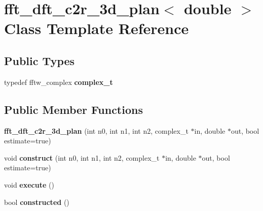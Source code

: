 \hypertarget{classfft__dft__c2r__3d__plan_3_01double_01_4}{
\section{fft\_\-dft\_\-c2r\_\-3d\_\-plan$<$ double $>$ Class Template Reference}
\label{classfft__dft__c2r__3d__plan_3_01double_01_4}
}
\subsection*{Public Types}
\begin{DoxyCompactItemize}
\item 
\hypertarget{classfft__dft__c2r__3d__plan_3_01double_01_4_af2e1937067ca9111b75f50a02b286be6}{
typedef fftw\_\-complex {\bfseries complex\_\-t}}
\label{classfft__dft__c2r__3d__plan_3_01double_01_4_af2e1937067ca9111b75f50a02b286be6}

\end{DoxyCompactItemize}
\subsection*{Public Member Functions}
\begin{DoxyCompactItemize}
\item 
\hypertarget{classfft__dft__c2r__3d__plan_3_01double_01_4_a6b75061e8b9a7e9610286a88d39c6de2}{
{\bfseries fft\_\-dft\_\-c2r\_\-3d\_\-plan} (int n0, int n1, int n2, complex\_\-t $\ast$in, double $\ast$out, bool estimate=true)}
\label{classfft__dft__c2r__3d__plan_3_01double_01_4_a6b75061e8b9a7e9610286a88d39c6de2}

\item 
\hypertarget{classfft__dft__c2r__3d__plan_3_01double_01_4_ac8a8cf81fd7a1744c7a6cea9c6a01a4c}{
void {\bfseries construct} (int n0, int n1, int n2, complex\_\-t $\ast$in, double $\ast$out, bool estimate=true)}
\label{classfft__dft__c2r__3d__plan_3_01double_01_4_ac8a8cf81fd7a1744c7a6cea9c6a01a4c}

\item 
\hypertarget{classfft__dft__c2r__3d__plan_3_01double_01_4_ad43ba2cee93d0690a620fa5a03903c60}{
void {\bfseries execute} ()}
\label{classfft__dft__c2r__3d__plan_3_01double_01_4_ad43ba2cee93d0690a620fa5a03903c60}

\item 
\hypertarget{classfft__dft__c2r__3d__plan_3_01double_01_4_aa3af7e4915a166df7260eb72310a3869}{
bool {\bfseries constructed} ()}
\label{classfft__dft__c2r__3d__plan_3_01double_01_4_aa3af7e4915a166df7260eb72310a3869}

\end{DoxyCompactItemize}
